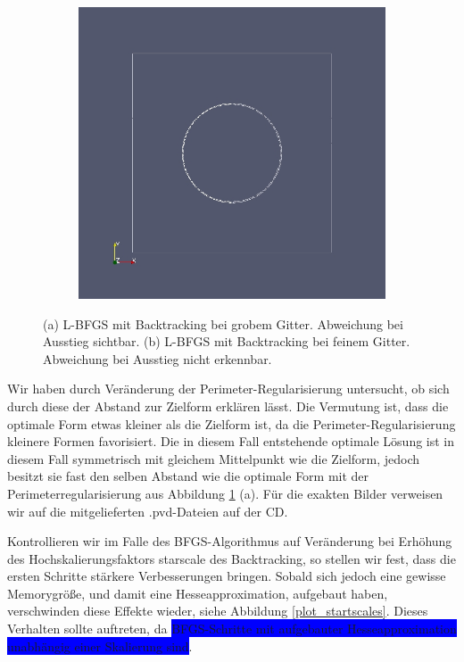 \begin{figure}
\begin{subfigure}{0.5\textwidth}
	\includegraphics[scale=0.25]{pic_bigcircle_bfgs_linesearch_fine.jpg}
	\caption{}	
	\end{subfigure}
\caption{(a) L-BFGS mit Backtracking bei grobem Gitter. Abweichung bei Ausstieg sichtbar. (b) L-BFGS mit Backtracking bei feinem Gitter. Abweichung bei Ausstieg nicht erkennbar.}
\label{Konvergenzbfgscircle}
\end{figure}

Wir haben durch Veränderung der Perimeter-Regularisierung untersucht, ob sich durch diese der Abstand zur Zielform erklären lässt. Die Vermutung ist, dass die optimale Form etwas kleiner als die Zielform ist, da die Perimeter-Regularisierung kleinere Formen favorisiert. Die in diesem Fall entstehende optimale Lösung ist in diesem Fall symmetrisch mit gleichem Mittelpunkt wie die Zielform, jedoch besitzt sie fast den selben Abstand wie die optimale Form mit der Perimeterregularisierung aus Abbildung \ref{Konvergenzbfgscircle} (a). Für die exakten Bilder verweisen wir auf die mitgelieferten \textsf{.pvd}-Dateien auf der CD.

Kontrollieren wir im Falle des BFGS-Algorithmus auf Veränderung bei Erhöhung des Hochskalierungsfaktors \textsf{starscale} des Backtracking, so stellen wir fest, dass die ersten Schritte stärkere Verbesserungen bringen. Sobald sich jedoch eine gewisse Memorygröße, und damit eine Hesseapproximation, aufgebaut haben, verschwinden diese Effekte wieder, siehe Abbildung \ref{plot_startscales}. Dieses Verhalten sollte auftreten, da \colorbox{blue}{BFGS-Schritte mit aufgebauter Hesseapproximation unabhängig einer Skalierung sind}.

